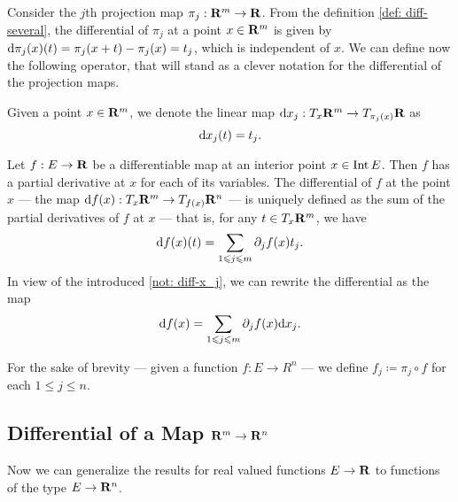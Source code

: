 Consider the \(j\)th projection map \(\pi_j: \mathbf{R}^m \to \mathbf{R}\). From the definition
\cref{def: diff-several}, the differential of \(\pi_j\) at a point \(x \in
\mathbf{R}^m\) is given by \(\mathrm{d} \pi_j(x)(t) = \pi_j(x + t) - \pi_j(x) = t_j\), which
is independent of \(x\). We can define now the following operator, that will
stand as a clever notation for the differential of the projection maps.

\begin{notation}\label{not: diff-x_j}
  Given a point \(x \in \mathbf{R}^m\), we denote the linear map \(\mathrm{d} x_j: T_x\mathbf{R}^m
  \to T_{\pi_j(x)}\mathbf{R}\) as
  \[
    \mathrm{d} x_j(t) = t_j.
  \]
\end{notation}

\begin{proposition}\label{prop: differential}
  Let \(f: E \to \mathbf{R}\) be a differentiable map at an interior point \(x \in \operatorname{Int}
  E\). Then \(f\) has a partial derivative at \(x\) for each of its variables.
  The differential of \(f\) at the point \(x\) --- the map \(\mathrm{d} f(x): T_x\mathbf{R}^m
  \to T_{f(x)}\mathbf{R}^n\) --- is uniquely defined as the sum of the partial
  derivatives of \(f\) at \(x\) --- that is, for any \(t \in T_x\mathbf{R}^m\), we have
  \[
    \mathrm{d} f(x)(t) = \sum_{1 \leqslant j \leqslant m} \partial_j f(x) t_j.
  \]
  In view of the introduced \cref{not: diff-x_j}, we can rewrite the
  differential as the map
  \[
    \mathrm{d} f(x) = \sum_{1 \leqslant j \leqslant m} \partial_j f(x) \mathrm{d} x_j.
  \]
\end{proposition}

\begin{notation}
  For the sake of brevity --- given a function \(f: E \to R^n\) --- we define
  \(f_j \coloneq \pi_j \circ f\) for each \(1 \leq j \leq n\).
\end{notation}

\subsection{Differential of a Map \texorpdfstring{\(\mathbf{R}^m \to \mathbf{R}^n\)}{Rm to Rn}}

Now we can generalize the results for real valued functions \(E \to \mathbf{R}\) to
functions of the type \(E \to \mathbf{R}^n\).

